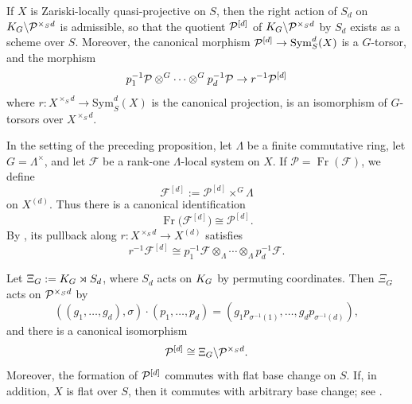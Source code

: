 \medskip

\begin{prop}\label{prop:symmetric_power_torsor}
If $X$ is Zariski-locally quasi-projective on $S$, then the right action of ${S}_d$ on $K_{G} \backslash \mathcal{P}^{\times_S d}$ is admissible,
so that the quotient $\mathcal{P}^{[d]}$ of $K_{G} \backslash \mathcal{P}^{\times_S d}$ by ${S}_d$ exists as a scheme over $S$.
Moreover, the canonical morphism $\mathcal{P}^{[d]} \to \mathrm{Sym}_S^d(X)$ is a $G$-torsor, 
and the morphism
\[
p_1^{-1}\mathcal{P} \otimes^G \cdots \otimes^G p_d^{-1}\mathcal{P} \to r^{-1}\mathcal{P}^{[d]}
\]
where $r : X^{\times_S d} \to \mathrm{Sym}_S^d(X)$ is the canonical projection, is an isomorphism of $G$-torsors over $X^{\times_S d}$.
\end{prop}

\begin{definition}
\label{definition:symmetric_power_local_system}
In the setting of the preceding proposition, let $\Lambda$ be a finite
commutative ring, let $G=\Lambda^\times$, and let
$\mathcal{F}$ be a rank-one $\Lambda$-local system on $X$. If
$\mathcal{P}=\operatorname{Fr}(\mathcal{F})$, we define
\[
\mathcal{F}^{[d]}:=\mathcal{P}^{[d]}\times^G\Lambda
\]
on $X^{(d)}$. Thus there is a canonical identification
\[
\operatorname{Fr}\bigl(\mathcal{F}^{[d]}\bigr)
\cong \mathcal{P}^{[d]}.
\]
By , its pullback along
$r:X^{\times_S d}\to X^{(d)}$ satisfies
\[
r^{-1}\mathcal{F}^{[d]}
\cong p_1^{-1}\mathcal{F}\otimes_\Lambda\cdots\otimes_\Lambda
p_d^{-1}\mathcal{F}.
\]
\end{definition}


\begin{prop}
\label{prop:symmetric_power_semidirect_quotient}
Let $\Xi_G:=K_{G}\rtimes S_d$, where $S_d$ acts on $K_{G}$ by permuting
coordinates. Then $\Xi_G$ acts on $\mathcal{P}^{\times_S d}$ by
\[
((g_1,\ldots,g_d),\sigma)\cdot(p_1,\ldots,p_d)
=
(g_1p_{\sigma^{-1}(1)},\ldots,g_dp_{\sigma^{-1}(d)}),
\]
and there is a canonical isomorphism
\[
\mathcal{P}^{[d]}
\cong
\Xi_G\backslash\mathcal{P}^{\times_S d}.
\]
Moreover, the formation of $\mathcal{P}^{[d]}$ commutes with flat base change on
$S$. If, in addition, $X$ is flat over $S$, then it commutes with arbitrary
base change; see \cite[Proposition~2.33]{Guignard2018}.
\end{prop}

